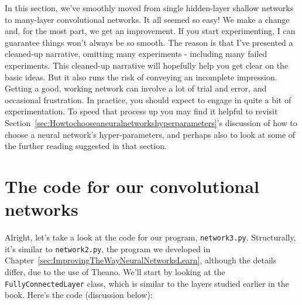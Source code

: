  In this section, we've smoothly moved from single hidden-layer shallow networks to many-layer convolutional networks. It all seemed so easy! We make a change and, for the most part, we get an improvement. If you start experimenting, I can guarantee things won't always be so smooth. The reason is that I've presented a cleaned-up narrative, omitting many experiments - including many failed experiments. This cleaned-up narrative will hopefully help you get clear on the basic ideas. But it also runs the risk of conveying an incomplete impression. Getting a good, working network can involve a lot of trial and error, and occasional frustration. In practice, you should expect to engage in quite a bit of experimentation. To speed that process up you may find it helpful to revisit Section~\ref{sec:Howtochooseaneuralnetworkshyperparameters}'s discussion of how to choose a neural network's hyper-parameters, and perhaps also to look at some of the further reading suggested in that section.

\section{The code for our convolutional networks}

Alright, let's take a look at the code for our program, \lstinline{network3.py}. Structurally, it's similar to \lstinline{network2.py}, the program we developed in Chapter~\ref{sec:ImprovingTheWayNeuralNetworksLearn}, although the details differ, due to the use of Theano. We'll start by looking at the \lstinline{FullyConnectedLayer} class, which is similar to the layers studied earlier in the book. Here's the code (discussion below):

